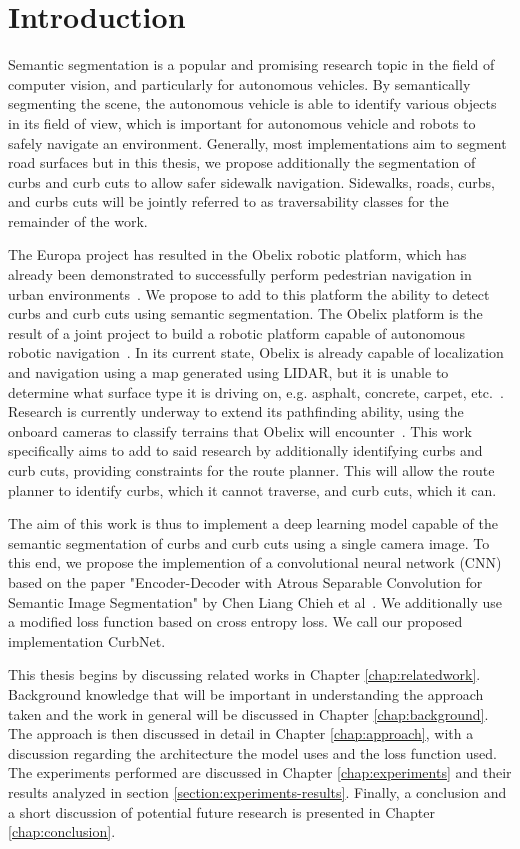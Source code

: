 \chapter{Introduction}\label{chap:introduction}
Semantic segmentation is a popular and promising research topic in the field of computer vision, and particularly for autonomous vehicles.
By semantically segmenting the scene, the autonomous vehicle is able to identify various objects in its field of view, which is important for autonomous vehicle and robots to safely navigate an environment.
Generally, most implementations aim to segment road surfaces but in this thesis, we propose additionally the segmentation of curbs and curb cuts to allow safer sidewalk navigation.
Sidewalks, roads, curbs, and curbs cuts will be jointly referred to as traversability classes for the remainder of the work.

The Europa project has resulted in the Obelix robotic platform, which has already been demonstrated to successfully perform pedestrian navigation in urban environments~\cite{europa}\cite{obelix-slam}.
We propose to add to this platform the ability to detect curbs and curb cuts using semantic segmentation.
The Obelix platform is the result of a joint project to build a robotic platform capable of autonomous robotic navigation~\cite{europa}. 
In its current state, Obelix is already capable of localization and navigation using a map generated using LIDAR, but it is unable to determine what surface type it is driving on, e.g. asphalt, concrete, carpet, etc.~\cite{jannik}.
Research is currently underway to extend its pathfinding ability, using the onboard cameras to classify terrains that Obelix will encounter~\cite{jannik}.
This work specifically aims to add to said research by additionally identifying curbs and curb cuts, providing constraints for the route planner.
This will allow the route planner to identify curbs, which it cannot traverse, and curb cuts, which it can.



The aim of this work is thus to implement a deep learning model capable of the semantic segmentation of curbs and curb cuts using a single camera image.
To this end, we propose the implemention of a convolutional neural network (CNN) based on the paper "Encoder-Decoder with Atrous Separable Convolution for Semantic Image Segmentation" by Chen Liang Chieh et al~\cite{deeplab}.
We additionally use a modified loss function based on cross entropy loss.
We call our proposed implementation CurbNet.

This thesis begins by discussing related works in Chapter \ref{chap:relatedwork}. 
Background knowledge that will be important in understanding the approach taken and the work in general will be discussed in Chapter \ref{chap:background}.
The approach is then discussed in detail in Chapter \ref{chap:approach}, with a discussion regarding the architecture the model uses and the loss function used.
The experiments performed are discussed in Chapter \ref{chap:experiments} and their results analyzed in section \ref{section:experiments-results}.
Finally, a conclusion and a short discussion of potential future research is presented in Chapter \ref{chap:conclusion}.